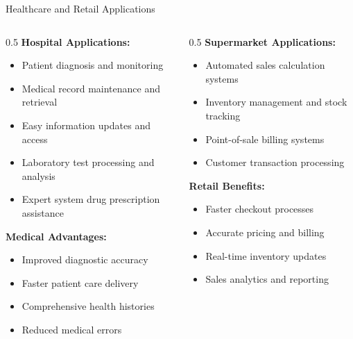 \documentclass[aspectratio=169]{beamer}
\begin{document}
\begin{frame}{Healthcare and Retail Applications}
    \begin{columns}
        \begin{column}{0.5\textwidth}
            \textbf{Hospital Applications:}
            \begin{itemize}
                \item Patient diagnosis and monitoring
                \item Medical record maintenance and retrieval
                \item Easy information updates and access
                \item Laboratory test processing and analysis
                \item Expert system drug prescription assistance
            \end{itemize}
            
            \textbf{Medical Advantages:}
            \begin{itemize}
                \item Improved diagnostic accuracy
                \item Faster patient care delivery
                \item Comprehensive health histories
                \item Reduced medical errors
            \end{itemize}
        \end{column}
        \begin{column}{0.5\textwidth}
            \textbf{Supermarket Applications:}
            \begin{itemize}
                \item Automated sales calculation systems
                \item Inventory management and stock tracking
                \item Point-of-sale billing systems
                \item Customer transaction processing
            \end{itemize}
            
            \textbf{Retail Benefits:}
            \begin{itemize}
                \item Faster checkout processes
                \item Accurate pricing and billing
                \item Real-time inventory updates
                \item Sales analytics and reporting
            \end{itemize}
        \end{column}
    \end{columns}
    

\end{frame}
\end{document}
